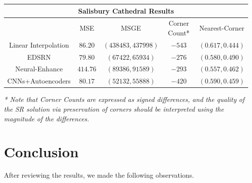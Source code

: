 \documentclass[letterpaper,12pt]{article}
\begin{document}
\begin{center}\begin{tabular}{ |c||c|c|c|c| }
    \hline
    \multicolumn{5}{|c|}{Salisbury Cathedral Results} \\
    \hline
    & MSE & MSGE & Corner Count* & Nearest-Corner\\
    \hline
    Linear Interpolation & $86.20$ & $(438483, 437998)$ & $-543$ & $(0.617, 0.444)$\\
    EDSRN & $79.80$ & $(67422, 65934)$ & $-276$ & $(0.580, 0.490)$\\
    Neural-Enhance & $414.76$ & $(89386, 91589)$ & $-293$ & $(0.557, 0.462)$\\
    CNNs+Autoencoders & $80.17$ & $(52132, 55888)$ & $-420$ & $(0.590, 0.459)$\\
    \hline
\end{tabular}\end{center}
\textit{* Note that Corner Counts are expressed as signed differences, and the quality of the SR solution via preservation of corners should be interpreted using the magnitude of the differences.}

\pagebreak
\section*{Conclusion}

After reviewing the results, we made the following observations.
\end{document}
